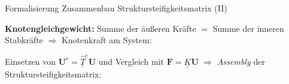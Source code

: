 \documentclass[aspectratio=169,professionalfonts]{beamer}
\begin{document}
\begin{frame}{Formalisierung Zusammenbau Struktursteifigkeitsmatrix (II)}
\small

\textbf{Knotengleichgewicht:} Summe der äußeren Kräfte $=$ Summe der inneren Stabkräfte $\Rightarrow$ Knotenkraft am System:

\vspace{0.4em}
\centering
{}

\vspace{0.6em}
\raggedright
Einsetzen von $\mathbf{U}^{e}=\underline{\underline{\hat{T}}}^{e}\mathbf{U}$ und Vergleich mit $\mathbf{F}=\underline{\underline{K}}\mathbf{U}$ $\Rightarrow$ \textit{Assembly} der Struktursteifigkeitsmatrix:

\vspace{0.4em}
\centering
{}

\end{frame}
\end{document}
